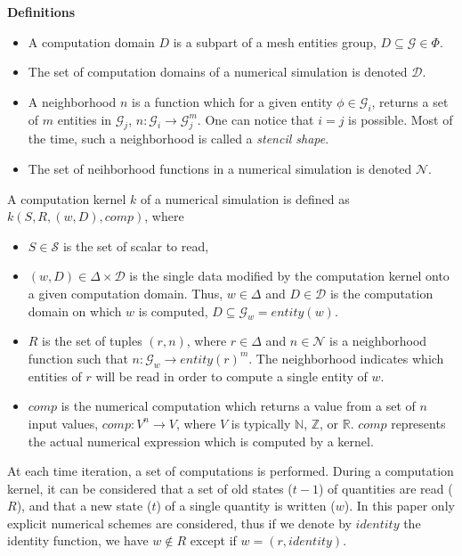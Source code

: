 \medskip
\noindent \textbf{Definitions}
\begin{itemize}
\item A computation domain $D$ is a subpart of a mesh entities group, $D \subseteq \mathcal{G} \in \Phi$.
\item The set of computation domains of a numerical simulation is denoted $\mathcal{D}$.
\item A neighborhood $n$ is a function which for a given entity $\phi \in \mathcal{G}_i$, returns a set of $m$ entities in $\mathcal{G}_j$, $n : \mathcal{G}_i \rightarrow \mathcal{G}_j^m$. One can notice that $i = j$ is possible. Most of the time, such a neighborhood is called a \emph{stencil shape}.
\item The set of neihborhood functions in a numerical simulation is denoted $\mathcal{N}$.
\end{itemize}

\begin{mydef}
A computation kernel $k$ of a numerical simulation is defined as $k(S,R,(w,D),comp)$, where 
\begin{itemize}
\item $S \in \mathcal{S}$ is the set of scalar to read, 
\item $(w,D) \in \Delta \times \mathcal{D}$ is the single data modified by the computation kernel onto a given computation domain. Thus, $w \in \Delta$ and $D \in \mathcal{D}$ is the computation domain on which $w$ is computed, $D \subseteq \mathcal{G}_w=entity(w)$.
\item $R$ is the set of tuples $(r,n)$, where $r \in \Delta$ and $n \in \mathcal{N}$ is a neighborhood function such that $n : \mathcal{G}_w \rightarrow entity(r)^m$. The neighborhood indicates which entities of $r$ will be read in order to compute a single entity of $w$. 
\item $comp$ is the numerical computation which returns a value from a set of $n$ input values, $comp: V^n \rightarrow V$, where $V$ is typically $\mathbb{N}$, $\mathbb{Z}$, or $\mathbb{R}$. $comp$ represents the actual numerical expression which is computed by a kernel.
\end{itemize}
\end{mydef}

At each time iteration, a set of computations is performed. During a computation kernel, it can be considered that a set of old states ($t-1$) of quantities are read ($R$), and that a new state ($t$) of a single quantity is written ($w$). In this paper only explicit numerical schemes are considered, thus if we denote by $identity$ the identity function, we have $w \not\in R$ except if $w=(r,identity)$.

